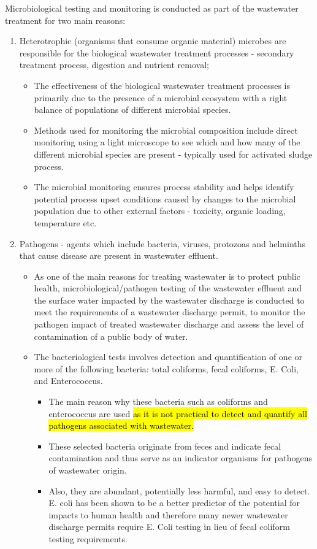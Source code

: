 Microbiological testing and monitoring is conducted as part of the wastewater treatment for two main reasons:
	\begin{enumerate}[1.]
		\item Heterotrophic (organisms that consume organic material) microbes are responsible for the biological wastewater treatment processes - secondary treatment process, digestion and nutrient removal; 
			\begin{itemize}
				\item The effectiveness of the biological wastewater treatment processes is primarily due to the presence of a microbial ecosystem with a right balance of populations of different microbial species.
				\item Methods used for monitoring the microbial composition include direct monitoring using a light microscope to see which and how many of the different microbial species are present - typically used for activated sludge process.
				\item The microbial monitoring ensures process stability and helps identify potential process upset conditions caused by changes to the microbial population due to other external factors - toxicity, organic loading, temperature etc.
			\end{itemize}
		\item Pathogens - agents which include bacteria, viruses, protozoas and helminths that cause disease are present in wastewater effluent.
			\begin{itemize}
				\item As one of the main reasons for treating wastewater is to protect public health, microbiological/pathogen testing of the wastewater effluent and the surface water impacted by the wastewater discharge is conducted to meet the requirements of a wastewater discharge permit, to monitor the pathogen impact of treated wastewater discharge and assess the level of contamination of a public body of water.
				\item The bacteriological tests involves detection and quantification of one or more of the following bacteria:  total coliforms, fecal coliforms, E. Coli, and Enterococcus.  
					 \begin{itemize}
					      \item The main reason why these bacteria such as coliforms and enterococcus are used \hl{as it is not practical to detect and quantify all pathogens associated with wastewater.}  
					      	\item These selected bacteria originate from feces and indicate fecal contamination and thus serve as an indicator organisms for pathogens of wastewater origin.  
					      	\item Also, they are abundant, potentially less harmful, and easy to detect.  E. coli has been shown to be a better predictor of the potential for impacts to human health and therefore many newer wastewater discharge permits require E. Coli testing in lieu of fecal coliform testing requirements.
					   \end{itemize}
			\end{itemize}
	\end{enumerate}
